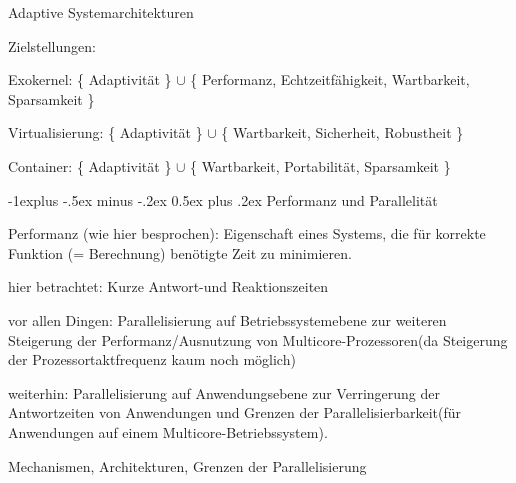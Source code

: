 \documentclass[a4paper]{article}
\makeatletter
\renewcommand{\subsection}{\@startsection{subsection}{2}{0mm}%
 {-1explus -.5ex minus -.2ex}%
 {0.5ex plus .2ex}%
 {\normalfont\normalsize\bfseries}}
\makeatother
\begin{document}
\begin{multicols}{3}
    Adaptive Systemarchitekturen

    \begin{itemize*}
        \item
        Zielstellungen:
        \begin{itemize*}
            \item Exokernel: \{ Adaptivität \} $\cup$ \{ Performanz, Echtzeitfähigkeit, Wartbarkeit, Sparsamkeit \}
            \item Virtualisierung: \{ Adaptivität \} $\cup$ \{ Wartbarkeit, Sicherheit, Robustheit \}
            \item Container: \{ Adaptivität \} $\cup$ \{ Wartbarkeit, Portabilität, Sparsamkeit \}
        \end{itemize*}
    \end{itemize*}


    \subsection{Performanz und
        Parallelität}

    \begin{itemize*}
        \item
        Performanz (wie hier besprochen): Eigenschaft eines Systems, die für
        korrekte Funktion (= Berechnung) benötigte Zeit zu minimieren.
        \item
        hier betrachtet: Kurze Antwort-und Reaktionszeiten
        \begin{enumerate*}

            \item vor allen Dingen: Parallelisierung auf Betriebssystemebene zur weiteren Steigerung der Performanz/Ausnutzung von Multicore-Prozessoren(da Steigerung der Prozessortaktfrequenz kaum noch möglich)
            \item weiterhin: Parallelisierung auf Anwendungsebene zur Verringerung der Antwortzeiten von Anwendungen und Grenzen der Parallelisierbarkeit(für Anwendungen auf einem Multicore-Betriebssystem).
        \end{enumerate*}
    \end{itemize*}

    Mechanismen, Architekturen, Grenzen der Parallelisierung


\end{multicols}
\end{document}
